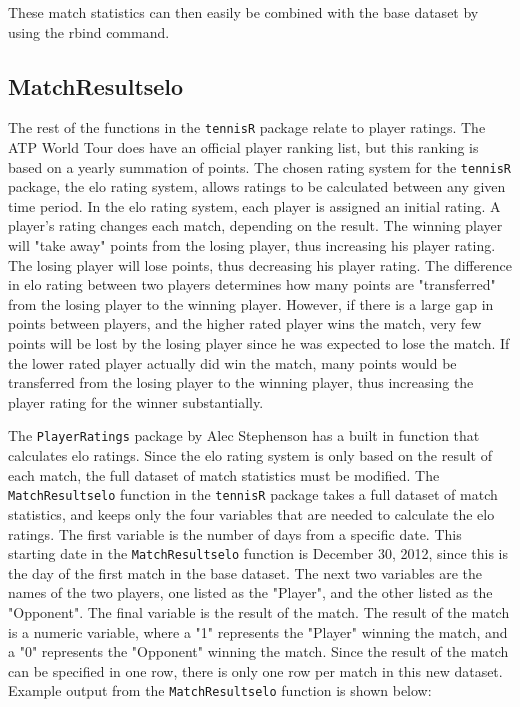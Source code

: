 \documentclass{article}\usepackage[]{graphicx}\usepackage[]{color}
\numberwithin{equation}{section} %
\newcommand{\pkg}[1]{{\texttt{#1}}}
\begin{document}
These match statistics can then easily be combined with the base dataset by using the rbind command.

\subsection{MatchResultselo}

The rest of the functions in the \pkg{tennisR} package relate to player ratings.  The ATP World Tour does have an official player ranking list, but this ranking is based on a yearly summation of points.  The chosen rating system for the \pkg{tennisR} package, the elo rating system, allows ratings to be calculated between any given time period.  In the elo rating system, each player is assigned an initial rating.  A player's rating changes each match, depending on the result.  The winning player will "take away" points from the losing player, thus increasing his player rating.  The losing player will lose points, thus decreasing his player rating.  The difference in elo rating between two players determines how many points are "transferred" from the losing player to the winning player.  However, if there is a large gap in points between players, and the higher rated player wins the match, very few points will be lost by the losing player since he was expected to lose the match.  If the lower rated player actually did win the match, many points would be transferred from the losing player to the winning player, thus increasing the player rating for the winner substantially.

The \pkg{PlayerRatings} package by Alec Stephenson has a built in function that calculates elo ratings.  Since the elo rating system is only based on the result of each match, the full dataset of match statistics must be modified.  The \texttt{MatchResultselo} function in the \pkg{tennisR} package takes a full dataset of match statistics, and keeps only the four variables that are needed to calculate the elo ratings.  The first variable is the number of days from a specific date.  This starting date in the \texttt{MatchResultselo} function is December 30, 2012, since this is the day of the first match in the base dataset.  The next two variables are the names of the two players, one listed as the "Player", and the other listed as the "Opponent".  The final variable is the result of the match.  The result of the match is a numeric variable, where a "1" represents the "Player" winning the match, and a "0" represents the "Opponent" winning the match.  Since the result of the match can be specified in one row, there is only one row per match in this new dataset.  Example output from the \texttt{MatchResultselo} function is shown below:
\end{document}
